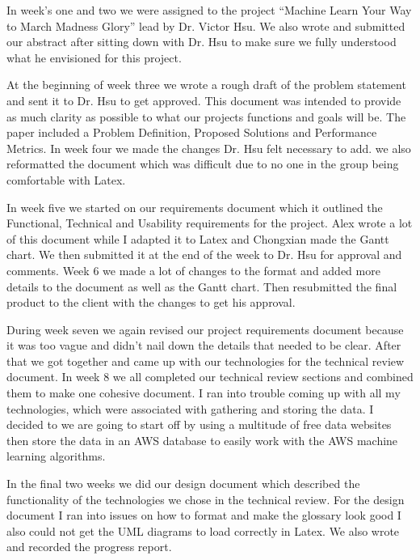 \documentclass[letterpaper, 10pt,titlepage]{article}
\begin{document}
In week’s one and two we were assigned to the project “Machine Learn Your Way to March Madness Glory” lead by Dr. Victor Hsu. We also wrote and submitted our abstract after sitting down with Dr. Hsu to make sure we fully understood what he envisioned for this project.
\par
At the beginning of week three we wrote a rough draft of the problem statement and sent it to Dr. Hsu to get approved. This document was intended to provide as much clarity as possible to what our projects functions and goals will be. The paper included a Problem Definition, Proposed Solutions and Performance Metrics. In week four we made the changes Dr. Hsu felt necessary to add. we also reformatted the document which was difficult due to no one in the group being comfortable with Latex.
\par
In week five we started on our requirements document which it outlined the Functional, Technical and Usability requirements for the project. Alex wrote a lot of this document while I adapted it to Latex and Chongxian made the Gantt chart. We then submitted it at the end of the week to Dr. Hsu for approval and comments. Week 6 we made a lot of changes to the format and added more details to the document as well as the Gantt chart. Then resubmitted the final product to the client with the changes to get his approval.
\par
During week seven we again revised our project requirements document because it was too vague and didn’t nail down the details that needed to be clear. After that we got together and came up with our technologies for the technical review document. In week 8 we all completed our technical review sections and combined them to make one cohesive document. I ran into trouble coming up with all my technologies, which were associated with gathering and storing the data. I decided to we are going to start off by using a multitude of free data websites then store the data in an AWS database to easily work with the AWS machine learning algorithms.
\par
In the final two weeks we did our design document which described the functionality of the technologies we chose in the technical review. For the design document I ran into issues on how to format and make the glossary look good I also could not get the UML diagrams to load correctly in Latex. We also wrote and recorded the progress report.
\par
\end{document}
